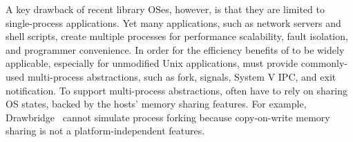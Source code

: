 A key drawback of recent library OSes, however,
is that they are limited to single-process applications.
Yet many applications, such as network servers and
shell scripts,
create multiple processes
for
performance scalability, fault isolation, and programmer convenience.
In order for the efficiency benefits of \liboses{} to be widely applicable,
especially for unmodified Unix applications,
\liboses{} must  provide commonly-used multi-process abstractions,
such as fork,  signals, System V IPC, and exit notification.
To support multi-process abstractions, \liboses{} often have to rely on sharing OS states,
backed by the hosts' memory sharing features.
For example, Drawbridge~\citep{porter11drawbridge} cannot simulate process forking because copy-on-write memory sharing is not a platform-independent features.



